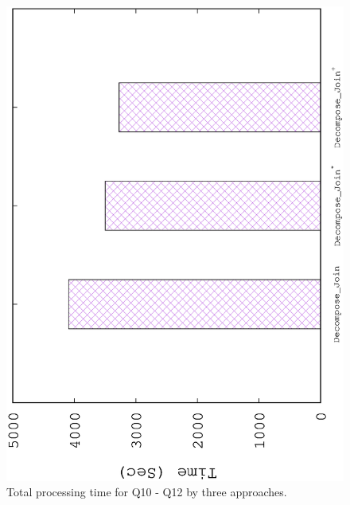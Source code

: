 \begin{figure}[H]
	\centering
	\includegraphics[scale=0.5, angle=270]{plot/threetotal.eps}
	\caption{Total processing time for Q10 - Q12 by three approaches.}
	\label{fig:threetotal}
\end{figure}

